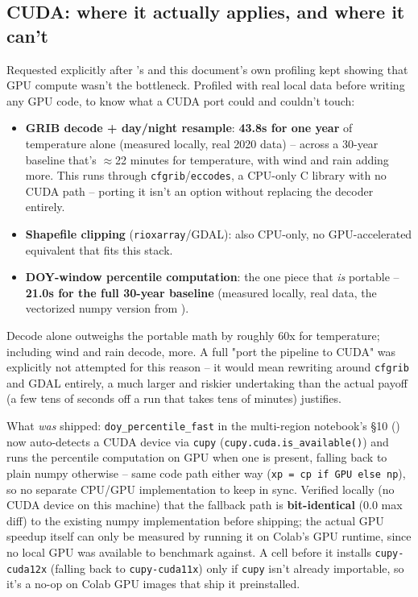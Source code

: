 \documentclass[11pt]{article}
\begin{document}
\subsection{CUDA: where it actually applies, and where it can't}
\label{sec:cuda}

Requested explicitly after 's and this
document's own profiling kept showing that GPU compute wasn't the
bottleneck. Profiled with real local data before writing any GPU code, to
know what a CUDA port could and couldn't touch:

\begin{itemize}[leftmargin=*]
\item \textbf{GRIB decode + day/night resample}: \textbf{43.8s for one
  year} of temperature alone (measured locally, real 2020 data) -- across
  a 30-year baseline that's $\approx$22 minutes for temperature, with wind
  and rain adding more. This runs through \texttt{cfgrib}/\texttt{eccodes},
  a CPU-only C library with no CUDA path -- porting it isn't an option
  without replacing the decoder entirely.
\item \textbf{Shapefile clipping} (\texttt{rioxarray}/GDAL): also
  CPU-only, no GPU-accelerated equivalent that fits this stack.
\item \textbf{DOY-window percentile computation}: the one piece that
  \emph{is} portable -- \textbf{21.0s for the full 30-year baseline}
  (measured locally, real data, the vectorized numpy version from
  ).
\end{itemize}

Decode alone outweighs the portable math by roughly 60x for temperature;
including wind and rain decode, more. A full "port the pipeline to CUDA"
was explicitly not attempted for this reason -- it would mean rewriting
around \texttt{cfgrib} and GDAL entirely, a much larger and riskier
undertaking than the actual payoff (a few tens of seconds off a run that
takes tens of minutes) justifies.

What \emph{was} shipped: \texttt{doy\_percentile\_fast} in the multi-region
notebook's \S10 () now auto-detects a CUDA
device via \texttt{cupy} (\texttt{cupy.cuda.is\_available()}) and runs the
percentile computation on GPU when one is present, falling back to plain
numpy otherwise -- same code path either way (\texttt{xp = cp if GPU else
np}), so no separate CPU/GPU implementation to keep in sync. Verified
locally (no CUDA device on this machine) that the fallback path is
\textbf{bit-identical} (0.0 max diff) to the existing numpy
implementation before shipping; the actual GPU speedup itself can only be
measured by running it on Colab's GPU runtime, since no local GPU was
available to benchmark against. A cell before it installs
\texttt{cupy-cuda12x} (falling back to \texttt{cupy-cuda11x}) only if
\texttt{cupy} isn't already importable, so it's a no-op on Colab GPU
images that ship it preinstalled.
\end{document}
